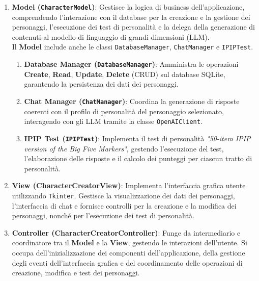 \begin{enumerate}
    \item 
    \textbf{Model (\texttt{CharacterModel})}:
    Gestisce la logica di business dell'applicazione, comprendendo l'interazione con il database per la creazione e la gestione dei personaggi, l'esecuzione dei test di personalità e la delega della generazione di contenuti al modello di linguaggio di grandi dimensioni (LLM).\\
    Il \textbf{Model} include anche le classi \texttt{DatabaseManager}, \texttt{ChatManager} e \texttt{IPIPTest}.
    \begin{enumerate}
        \item
        \textbf{Database Manager (\texttt{DatabaseManager})}:
        Amministra le operazioni \textbf{Create}, \textbf{Read}, \textbf{Update}, \textbf{Delete} (CRUD) sul database SQLite, garantendo la persistenza dei dati dei personaggi.

        \item
        \textbf{Chat Manager (\texttt{ChatManager})}: Coordina la generazione di risposte coerenti con il profilo di personalità del personaggio selezionato, interagendo con gli LLM tramite la classe \texttt{OpenAIClient}.
        
        \item
        \textbf{IPIP Test (\texttt{IPIPTest})}:
        Implementa il test di personalità \textit{"50-item IPIP version of the Big Five Markers"}\cite{goldberg1992}, gestendo l'esecuzione del test, l'elaborazione delle risposte e il calcolo dei punteggi per ciascun tratto di personalità.
    \end{enumerate}
    
    \item 
    \textbf{View (CharacterCreatorView)}:
    Implementa l'interfaccia grafica utente utilizzando \texttt{Tkinter}. Gestisce la visualizzazione dei dati dei personaggi, l'interfaccia di chat e fornisce controlli per la creazione e la modifica dei personaggi, nonché per l'esecuzione dei test di personalità.
    
    \item
    \textbf{Controller (CharacterCreatorController)}:
    Funge da intermediario e coordinatore tra il \textbf{Model} e la \textbf{View}, gestendo le interazioni dell'utente. Si occupa dell'inizializzazione dei componenti dell'applicazione, della gestione degli eventi dell'interfaccia grafica e del coordinamento delle operazioni di creazione, modifica e test dei personaggi.


\end{enumerate}
